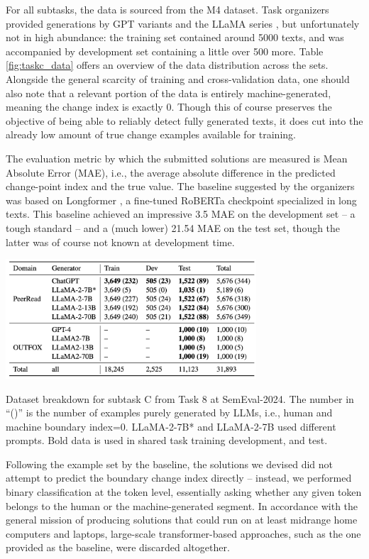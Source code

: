 For all subtasks, the data is sourced from the M4 \citep{wang-etal-2024-m4} dataset.
Task organizers provided generations by GPT variants and the LLaMA series \citep{touvron2023llama}, but unfortunately not in high abundance: the training set contained around 5000 texts, and was accompanied by development set containing a little over 500 more.
Table \ref{fig:taskc_data} offers an overview of the data distribution across the sets.
Alongside the general scarcity of training and cross-validation data, one should also note that a relevant portion of the data is entirely machine-generated, meaning the change index is exactly 0.
Though this of course preserves the objective of being able to reliably detect fully generated texts, it does cut into the already low amount of true change examples available for training.

The evaluation metric by which the submitted solutions are measured is Mean Absolute Error (MAE), i.e., the average absolute difference in the predicted change-point index and the true value.
The baseline suggested by the organizers was based on Longformer \citep{beltagy2020longformerlongdocumenttransformer}, a fine-tuned RoBERTa checkpoint specialized in long texts.
This baseline achieved an impressive 3.5 MAE on the development set -- a tough standard -- and a (much lower) 21.54 MAE on the test set, though the latter was of course not known at development time.


\begin{table}[ht]
    \centering
    \includegraphics[width=0.7\textwidth]{assets/subtaskc-data.png}
    \caption{
        Dataset breakdown for subtask C from Task 8 at SemEval-2024.
        The number in “()” is the number of examples purely generated by LLMs, i.e., human and machine boundary index=0.
        LLaMA-2-7B* and LLaMA-2-7B used different prompts. Bold data is used in shared task training development, and test.
    }
    \label{fig:taskc_data}
\end{table}

Following the example set by the baseline, the solutions we devised did not attempt to predict the boundary change index directly -- instead, we performed binary classification at the token level, essentially asking whether any given token belongs to the human or the machine-generated segment.
In accordance with the general mission of producing solutions that could run on at least midrange home computers and laptops, large-scale transformer-based approaches, such as the one provided as the baseline, were discarded altogether.

